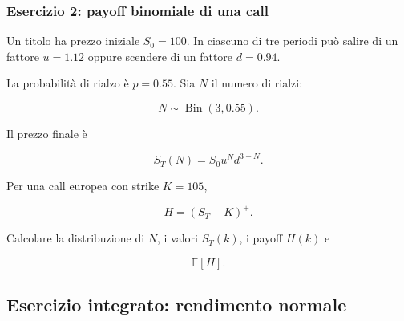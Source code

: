 \documentclass[handout]{beamer}%
\providecommand{\E}{\mathbb{E}}
\providecommand{\1}{\mathbf{1}}
\providecommand{\QTR}[2]{\csname #1\endcsname{#2}}
\begin{document}
\begin{frame}%
%

\frametitle{Esercizio 2: payoff binomiale di una call}%


Un titolo ha prezzo iniziale $S_{0}=100$. In ciascuno di tre periodi pu\`{o}
salire di un fattore $u=1.12$ oppure scendere di un fattore $d=0.94$.

\medskip

La probabilit\`{a} di rialzo \`{e} $p=0.55$. Sia $N$ il numero di rialzi:%

\[
N\sim\operatorname{Bin}(3,0.55).
\]


Il prezzo finale \`{e}%

\[
S_{T}(N)=S_{0}u^{N} d^{3-N}.
\]


\medskip

Per una call europea con strike $K=105$,%

\[
H=(S_{T}-K)^{+}.
\]


Calcolare la distribuzione di $N$, i valori $S_{T}(k)$, i payoff $H(k)$ e%

\[
\E[H].
\]
%

\transboxout
\end{frame}%




\subsection{Esercizio integrato: rendimento normale}%
\end{document}

